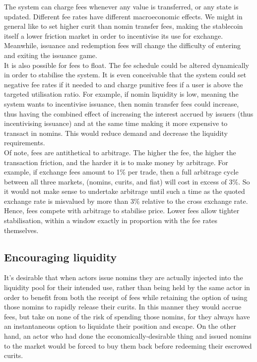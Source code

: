 The system can charge fees whenever any value is transferred, or any state is updated.
\noindent Different fee rates have different macroeconomic effects. We might in general like to set higher curit than nomin transfer fees, making the stablecoin itself a lower friction market in order to incentivise its use for exchange. Meanwhile, issuance and redemption fees will change the difficulty of entering and exiting the issuance game. \\

\noindent It is also possible for fees to float. The fee schedule could be altered dynamically in order to stabilise the system. It is even conceivable that the system could set negative fee rates if it needed to and charge punitive fees if a user is above the targeted utilisation ratio. For example, if nomin liquidity is low, meaning the system wants to incentivise issuance, then nomin transfer fees could increase, thus having the combined effect of increasing the interest accrued by issuers (thus incentivising issuance) and at the same time making it more expensive to transact in nomins. This would reduce demand and decrease the liquidity requirements. \\

\noindent Of note, fees are antithetical to arbitrage. The higher the fee, the higher the transaction friction, and the harder it is to make money by arbitrage. For example, if exchange fees amount to 1\% per trade, then a full arbitrage cycle between all three markets, (nomins, curits, and fiat) will cost in excess of 3\%. So it would not make sense to undertake arbitrage until such a time as the quoted exchange rate is misvalued by more than 3\% relative to the cross exchange rate. Hence, fees compete with arbitrage to stabilise price. Lower fees allow tighter stabilisation, within a window exactly in proportion with the fee rates themselves.

\subsection{Encouraging liquidity}

\noindent It's desirable that when actors issue nomins they are actually injected into the liquidity pool for their intended use,
rather than being held by the same actor in order to benefit from both the receipt of fees while retaining the option of using those nomins to rapidly release their curits.
In this manner they would accrue fees, but take on none of the risk of spending those nomins, for they always have an instantaneous option to liquidate their position and escape.
On the other hand, an actor who had done the economically-desirable thing and issued nomins to the market would be forced to buy them back before redeeming their escrowed curits.

